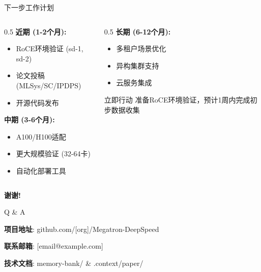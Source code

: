 \documentclass[aspectratio=169,10pt]{beamer}
\begin{document}
\begin{frame}{下一步工作计划}
\begin{columns}
\begin{column}{0.5\textwidth}
\textbf{近期 (1-2个月):}
\begin{itemize}
    \item RoCE环境验证 (sd-1, sd-2)
    \item 论文投稿 (MLSys/SC/IPDPS)
    \item 开源代码发布
\end{itemize}
\vspace{0.3cm}
\textbf{中期 (3-6个月):}
\begin{itemize}
    \item A100/H100适配
    \item 更大规模验证 (32-64卡)
    \item 自动化部署工具
\end{itemize}
\end{column}
\begin{column}{0.5\textwidth}
\textbf{长期 (6-12个月):}
\begin{itemize}
    \item 多租户场景优化
    \item 异构集群支持
    \item 云服务集成
\end{itemize}
\vspace{0.5cm}
\begin{alertblock}{立即行动}
准备RoCE环境验证，预计1周内完成初步数据收集
\end{alertblock}
\end{column}
\end{columns}
\end{frame}

\begin{frame}
\begin{center}
\Huge \textbf{谢谢!}
\vspace{1cm}

\Large Q \& A
\vspace{1cm}

\normalsize
\textbf{项目地址}: github.com/[org]/Megatron-DeepSpeed

\textbf{联系邮箱}: [email@example.com]

\textbf{技术文档}: memory-bank/ \& .context/paper/
\end{center}
\end{frame}

\appendix
\end{document}
